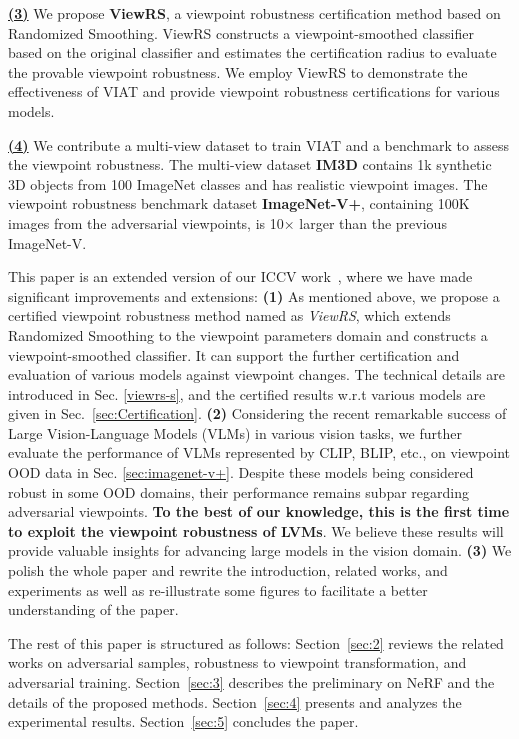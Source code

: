 \documentclass[10pt,journal,compsoc]{IEEEtran}
\begin{document}
\textbf{\underline{(3)}} We propose \textbf{ViewRS}, a viewpoint robustness certification method based on Randomized Smoothing. ViewRS constructs a viewpoint-smoothed classifier based on the original classifier and estimates the certification radius to evaluate the provable viewpoint robustness. We employ ViewRS to demonstrate the effectiveness of VIAT and provide viewpoint robustness certifications for various models.

\textbf{\underline{(4)}} We contribute a multi-view dataset to train VIAT and a benchmark to assess the viewpoint robustness. The multi-view dataset \textbf{IM3D} contains 1k synthetic 3D objects from 100 ImageNet classes and has realistic viewpoint images. The viewpoint robustness benchmark dataset \textbf{ImageNet-V+}, containing 100K images from the adversarial viewpoints, is 10× larger than the previous ImageNet-V\cite{dong2022viewfool}. 

This paper is an extended version of our ICCV work~\cite{ruan2023towards}, where we have made significant improvements and extensions: \textbf{(1)} As mentioned above,  we propose a certified viewpoint robustness method named as \emph{ViewRS}, which extends Randomized Smoothing to the viewpoint parameters domain and constructs a viewpoint-smoothed classifier. It can support the further certification and evaluation of various models against viewpoint changes. The technical details are introduced in Sec. \ref{viewrs-s}, and the certified results w.r.t various models are given in  Sec.~\ref{sec:Certification}. \textbf{(2)} Considering the recent remarkable success of Large Vision-Language Models (VLMs) in various vision tasks, we further evaluate the performance of VLMs represented by CLIP, BLIP, etc., on viewpoint OOD  data in Sec. \ref{sec:imagenet-v+}. Despite these models being considered robust in some OOD domains, their performance remains subpar regarding adversarial viewpoints. \textbf{To the best of our knowledge, this is the first time to exploit the viewpoint robustness of LVMs}. We believe these results will provide valuable insights for advancing large models in the vision domain. \textbf{(3)} We polish the whole paper and rewrite the introduction, related works, and experiments as well as re-illustrate some figures to facilitate a better understanding of the paper. 

The rest of this paper is structured as follows: Section~\ref{sec:2} reviews the related works on adversarial samples, robustness to viewpoint transformation, and adversarial training. Section~\ref{sec:3} describes the preliminary on NeRF and the details of the proposed methods. Section~\ref{sec:4} presents and analyzes the experimental results. Section~\ref{sec:5} concludes the paper.
\end{document}
